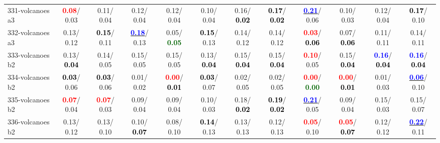 \begin{table}[h]
\begin{center}
{\begin{tabular}{lc|c|c|c|c|c|c|c|c|c|c}
331-volcanoes a3 & \textcolor{red}{\textbf{  0.08}}/  0.03 &   0.11/  0.04 &   0.12/  0.04 &   0.12/  0.04 &   0.10/  0.04 &   0.16/\textcolor{black}{\textbf{  0.02}} & \textcolor{black}{\textbf{  0.17}}/\textcolor{black}{\textbf{  0.02}} & \underline{\textcolor{blue}{\textbf{  0.21}}}/  0.06 &   0.10/  0.03 &   0.12/  0.04 & \textcolor{black}{\textbf{  0.17}}/  0.10 \\
332-volcanoes a3 &   0.13/  0.12 & \textcolor{black}{\textbf{  0.15}}/  0.11 & \underline{\textcolor{blue}{\textbf{  0.18}}}/  0.13 &   0.05/\textcolor{darkgreen}{\textbf{  0.05}} & \textcolor{black}{\textbf{  0.15}}/  0.13 &   0.14/  0.12 &   0.14/  0.12 & \textcolor{red}{\textbf{  0.03}}/\textcolor{black}{\textbf{  0.06}} &   0.07/\textcolor{black}{\textbf{  0.06}} &   0.11/  0.11 &   0.14/  0.11 \\
333-volcanoes b2 &   0.13/\textcolor{black}{\textbf{  0.04}} &   0.14/  0.05 &   0.15/  0.05 &   0.15/  0.05 &   0.13/\textcolor{black}{\textbf{  0.04}} &   0.15/\textcolor{black}{\textbf{  0.04}} &   0.15/\textcolor{black}{\textbf{  0.04}} & \textcolor{red}{\textbf{  0.10}}/  0.05 &   0.15/\textcolor{black}{\textbf{  0.04}} & \textcolor{blue}{\textbf{  0.16}}/\textcolor{black}{\textbf{  0.04}} & \textcolor{blue}{\textbf{  0.16}}/\textcolor{black}{\textbf{  0.04}} \\
334-volcanoes b2 & \textcolor{black}{\textbf{  0.03}}/  0.06 & \textcolor{black}{\textbf{  0.03}}/  0.06 &   0.01/  0.02 & \textcolor{red}{\textbf{  0.00}}/\textcolor{black}{\textbf{  0.01}} & \textcolor{black}{\textbf{  0.03}}/  0.07 &   0.02/  0.05 &   0.02/  0.05 & \textcolor{red}{\textbf{  0.00}}/\textcolor{darkgreen}{\textbf{  0.00}} & \textcolor{red}{\textbf{  0.00}}/\textcolor{black}{\textbf{  0.01}} &   0.01/  0.03 & \underline{\textcolor{blue}{\textbf{  0.06}}}/  0.10 \\ \hline
335-volcanoes b2 & \textcolor{red}{\textbf{  0.07}}/  0.04 & \textcolor{red}{\textbf{  0.07}}/  0.03 &   0.09/  0.04 &   0.09/  0.04 &   0.10/  0.03 &   0.18/\textcolor{black}{\textbf{  0.02}} & \textcolor{black}{\textbf{  0.19}}/\textcolor{black}{\textbf{  0.02}} & \underline{\textcolor{blue}{\textbf{  0.21}}}/  0.05 &   0.09/  0.04 &   0.15/  0.03 &   0.15/  0.07 \\
336-volcanoes b2 &   0.13/  0.12 &   0.13/  0.10 &   0.10/\textcolor{black}{\textbf{  0.07}} &   0.08/  0.10 & \textcolor{black}{\textbf{  0.14}}/  0.13 &   0.13/  0.13 &   0.12/  0.13 & \textcolor{red}{\textbf{  0.05}}/  0.10 & \textcolor{red}{\textbf{  0.05}}/\textcolor{black}{\textbf{  0.07}} &   0.12/  0.12 & \underline{\textcolor{blue}{\textbf{  0.22}}}/  0.11 \\

\end{tabular}}
\end{center}
\end{table}
